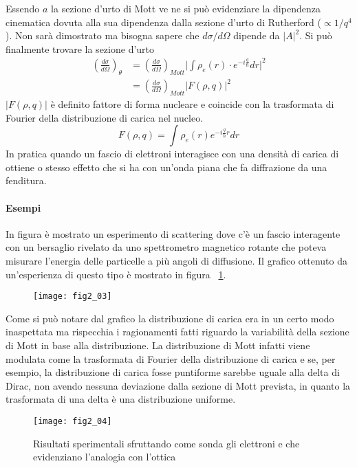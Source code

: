 Essendo $a$ la sezione d'urto di Mott ve ne si può evidenziare la dipendenza cinematica dovuta alla sua dipendenza dalla sezione d'urto di Rutherford ($\propto 1/q^4$). 
Non sarà dimostrato ma bisogna sapere che $d\sigma/d\Omega$ dipende da $|A|^2$.
Si può finalmente trovare la sezione d'urto
\begin{equation}
\begin{split}
\left(\frac{d\sigma}{d\Omega}\right)_\theta &=\left(\frac{d\sigma}{d\Omega}\right)_{Mott}\biggl| \int\rho_e(r)\cdot e^{-i\frac{q}{\hbar}}dr\biggl|^2\\
&=\left(\frac{d\sigma}{d\Omega}\right)_{Mott}|F(\rho,q)|^2
\end{split}
\end{equation}
$|F(\rho,q)|$ è definito fattore di forma nucleare e coincide con la trasformata di Fourier della distribuzione di carica nel nucleo.
\begin{equation}
F(\rho, q)=\int \rho_e(r)e^{-i\frac{q}{\hbar}r}dr
\end{equation}
In pratica quando un fascio di elettroni interagisce con una densità di carica di ottiene o stesso effetto che si ha con un'onda piana che fa diffrazione da una fenditura.

\paragraph{Esempi}
In figura è mostrato un esperimento di scattering dove c'è un fascio interagente con un bersaglio rivelato da uno spettrometro magnetico rotante che poteva misurare l'energia delle particelle a più angoli di diffusione. Il grafico ottenuto da un'esperienza di questo tipo è mostrato in figura ~\ref{N:01}.
\begin{figure}[h]
\centering
\texttt{[image: fig2\_03]}
\end{figure}

Come si può notare dal grafico la distribuzione di carica era in un certo modo inaspettata ma rispecchia i ragionamenti fatti riguardo la variabilità della sezione di Mott in base alla distribuzione.
La distribuzione di Mott infatti viene modulata come la trasformata di Fourier della distribuzione di carica e se, per esempio, la distribuzione di carica fosse puntiforme sarebbe uguale alla delta di Dirac, non avendo nessuna deviazione dalla sezione di Mott prevista, in quanto la trasformata di una delta è una distribuzione uniforme. 
\begin{figure}[h]
\centering
\texttt{[image: fig2\_04]}
\caption{Risultati sperimentali sfruttando come sonda gli elettroni e che evidenziano l'analogia con l'ottica}
\label{N:01}
\end{figure}

